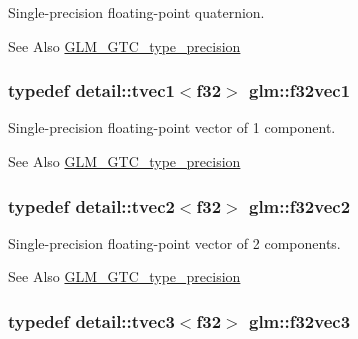 Single-\/precision floating-\/point quaternion. 

\begin{DoxySeeAlso}{See Also}
\hyperlink{group__gtc__type__precision}{G\-L\-M\-\_\-\-G\-T\-C\-\_\-type\-\_\-precision} 
\end{DoxySeeAlso}
\hypertarget{group__gtc__type__precision_ga7cc1cb4f45d7274383e6f4ee7fd46f33}{
\subsubsection[{f32vec1}]{\setlength{\rightskip}{0pt plus 5cm}typedef detail\-::tvec1$<$f32$>$ {\bf glm\-::f32vec1}}}\label{group__gtc__type__precision_ga7cc1cb4f45d7274383e6f4ee7fd46f33}


Single-\/precision floating-\/point vector of 1 component. 

\begin{DoxySeeAlso}{See Also}
\hyperlink{group__gtc__type__precision}{G\-L\-M\-\_\-\-G\-T\-C\-\_\-type\-\_\-precision} 
\end{DoxySeeAlso}
\hypertarget{group__gtc__type__precision_ga6262c3e58cb4a96545b9ec56f141fa1a}{
\subsubsection[{f32vec2}]{\setlength{\rightskip}{0pt plus 5cm}typedef detail\-::tvec2$<$f32$>$ {\bf glm\-::f32vec2}}}\label{group__gtc__type__precision_ga6262c3e58cb4a96545b9ec56f141fa1a}


Single-\/precision floating-\/point vector of 2 components. 

\begin{DoxySeeAlso}{See Also}
\hyperlink{group__gtc__type__precision}{G\-L\-M\-\_\-\-G\-T\-C\-\_\-type\-\_\-precision} 
\end{DoxySeeAlso}
\hypertarget{group__gtc__type__precision_ga6bb80987350b58f1869fd877bf70d316}{
\subsubsection[{f32vec3}]{\setlength{\rightskip}{0pt plus 5cm}typedef detail\-::tvec3$<$f32$>$ {\bf glm\-::f32vec3}}}\label{group__gtc__type__precision_ga6bb80987350b58f1869fd877bf70d316}


